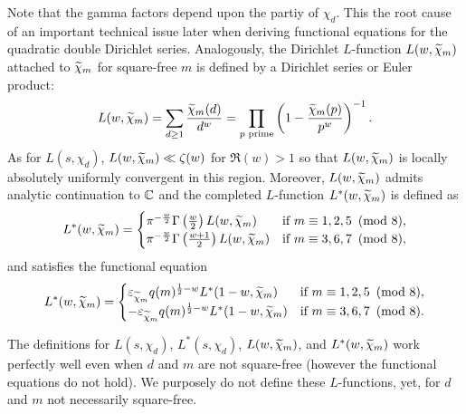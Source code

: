\documentclass[12pt,reqno,oneside]{amsart}
\begin{document}
    Note that the gamma factors depend upon the partiy of $\chi_{d}$. This the root cause of an important technical issue later when deriving functional equations for the quadratic double Dirichlet series. Analogously, the Dirichlet $L$-function $L(w,\widetilde{\chi}_{m})$ attached to $\widetilde{\chi}_{m}$ for square-free $m$ is defined by a Dirichlet series or Euler product:
    \[
        L(w,\widetilde{\chi}_{m}) = \sum_{d \ge 1}\frac{\widetilde{\chi}_{m}(d)}{d^{w}} = \prod_{p \text{ prime}}\left(1-\frac{\widetilde{\chi}_{m}(p)}{p^{w}}\right)^{-1}.
    \]
    As for $L(s,\chi_{d})$, $L(w,\widetilde{\chi}_{m}) \ll \zeta(w)$ for $\Re(w) > 1$ so that $L(w,\widetilde{\chi}_{m})$ is locally absolutely uniformly convergent in this region. Moreover, $L(w,\widetilde{\chi}_{m})$ admits analytic continuation to $\mathbb{C}$ and the completed $L$-function $L^{\ast}(w,\widetilde{\chi}_{m})$ is defined as
    \[
        L^{\ast}(w,\widetilde{\chi}_{m}) = \begin{cases} \pi^{-\frac{w}{2}}\Gamma\left(\frac{w}{2}\right)L(w,\widetilde{\chi}_{m}) & \text{if $m \equiv 1,2,5 \ \left(\text{mod }8\right)$}, \\ \pi^{-\frac{w}{2}}\Gamma\left(\frac{w+1}{2}\right)L(w,\widetilde{\chi}_{m}) & \text{if $m \equiv 3,6,7 \ \left(\text{mod }8\right)$}, \end{cases}
    \]
    and satisfies the functional equation
    \[
        L^{\ast}(w,\widetilde{\chi}_{m}) = \begin{cases} \varepsilon_{\widetilde{\chi}_{m}}q(m)^{\frac{1}{2}-w}L^{\ast}(1-w,\widetilde{\chi}_{m}) & \text{if $m \equiv 1,2,5 \ \left(\text{mod }8\right)$}, \\ -\varepsilon_{\widetilde{\chi}_{m}}q(m)^{\frac{1}{2}-w}L^{\ast}(1-w,\widetilde{\chi}_{m}) & \text{if $m \equiv 3,6,7 \ \left(\text{mod }8\right)$}. \end{cases}
    \]

    \begin{remark}
        The definitions for $L(s,\chi_{d})$, $L^{\ast}(s,\chi_{d})$, $L(w,\widetilde{\chi}_{m})$, and $L^{\ast}(w,\widetilde{\chi}_{m})$ work perfectly well even when $d$ and $m$ are not square-free (however the functional equations do not hold). We purposely do not define these $L$-functions, yet, for $d$ and $m$ not necessarily square-free.
    \end{remark}
\end{document}
